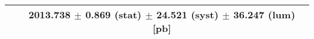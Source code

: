 \begin{tabular}{lc}
\hline
                               & 2013.738 $\pm$ 0.869 (stat) $\pm$ 24.521 (syst) $\pm$ 36.247 (lum) [pb]  \\
\hline
\end{tabular}
